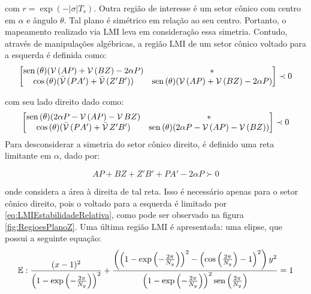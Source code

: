 \noindent com $r = \exp{\left(-|\sigma|T_s\right)}$. Outra região de interesse é um setor cônico com centro em $\alpha$ e ângulo $\theta$. Tal plano é simétrico em relação ao seu centro. Portanto, o mapeamento realizado via LMI leva em consideração essa simetria. Contudo, através de manipulações algébricas, a região LMI de um setor cônico voltado para a esquerda é definida como:
\begin{equation}
\begin{bmatrix*}[c]
\sen{(\theta)(\Herm{(AP)} + \Herm{(BZ)} -2\alpha P)} & * \\
\cos{(\theta)(\herm{(PA')} + \herm{(Z'B')})} & \sen{(\theta)(\Herm{(AP)} + \Herm{(BZ)} -2\alpha P)}
\end{bmatrix*}
\prec 0\label{eq:LMIESetorConicoEsquerdo}
\end{equation}

\noindent com seu lado direito dado como:
\begin{equation}
\begin{bmatrix*}[c]
\sen{(\theta)(2\alpha P - \Herm{(AP)} - \Herm{BZ})} & * \\
\cos{(\theta)(\herm{(PA')} + \herm{Z'B'})} & \sen{(\theta)(2\alpha P - \Herm{(AP)} - \Herm{(BZ)})}
\end{bmatrix*}
\prec 0\label{eq:LMIESetorConicoDireito}
\end{equation}
Para desconsiderar a simetria do setor cônico direito, é definido uma reta limitante em $\alpha$, dado por:

\begin{equation}
AP + BZ + Z'B' + PA' -2\alpha P\label{eq:LMIRightBounded} \succ 0
\end{equation}

\noindent onde considera a área à direita de tal reta. Isso é necessário apenas para o setor cônico direito, pois o voltado para a esquerda é limitado por \eqref{eq:LMIEstabilidadeRelativa}, como pode ser observado na figura \ref{fig:RegioesPlanoZ}. Uma última região LMI é apresentada: uma elipse, que possui a seguinte equação\cite{CHIQUETO2021}:
\begin{equation}
\mathbb{E}: \dfrac{(x-1)^2}{\left(1-\exp{\left(-\frac{2\pi}{N_y}\right)}\right)^2} + \dfrac{\left(\left(1-\exp{\left(-\frac{2\pi}{N_y}\right)}\right)^2 - \left(\cos{\left(\frac{2\pi}{N_y}\right)} - 1\right)^2\right)y^2}{\left(1-\exp{\left(-\frac{2\pi}{N_y}\right)}\right)^2\operatorname{sen}{\left(\frac{2\pi}{N_y}\right)}} = 1\label{eq:Elipse}
\end{equation}

